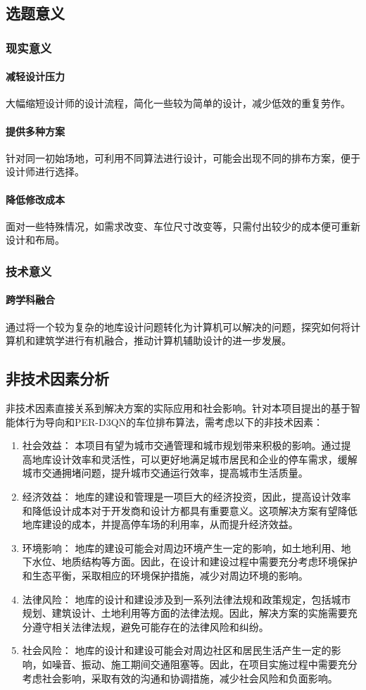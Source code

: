 \subsection{选题意义}
\subsubsection{现实意义}
  \paragraph{减轻设计压力} 大幅缩短设计师的设计流程，简化一些较为简单的设计，减少低效的重复劳作。
  \paragraph{提供多种方案} 针对同一初始场地，可利用不同算法进行设计，可能会出现不同的排布方案，便于设计师进行选择。
  \paragraph{降低修改成本} 面对一些特殊情况，如需求改变、车位尺寸改变等，只需付出较少的成本便可重新设计和布局。
\subsubsection{技术意义}
  \paragraph{跨学科融合} 通过将一个较为复杂的地库设计问题转化为计算机可以解决的问题，探究如何将计算机和建筑学进行有机融合，推动计算机辅助设计的进一步发展。

\subsection{非技术因素分析}
非技术因素直接关系到解决方案的实际应用和社会影响。针对本项目提出的基于智能体行为导向和PER-D3QN的车位排布算法，需考虑以下的非技术因素：
\begin{enumerate}
  \item 社会效益： 本项目有望为城市交通管理和城市规划带来积极的影响。通过提高地库设计效率和灵活性，可以更好地满足城市居民和企业的停车需求，缓解城市交通拥堵问题，提升城市交通运行效率，提高城市生活质量。
  \item 经济效益： 地库的建设和管理是一项巨大的经济投资，因此，提高设计效率和降低设计成本对于开发商和设计方都具有重要意义。这项解决方案有望降低地库建设的成本，并提高停车场的利用率，从而提升经济效益。
   \item 环境影响： 地库的建设可能会对周边环境产生一定的影响，如土地利用、地下水位、地质结构等方面。因此，在设计和建设过程中需要充分考虑环境保护和生态平衡，采取相应的环境保护措施，减少对周边环境的影响。
  \item 法律风险： 地库的设计和建设涉及到一系列法律法规和政策规定，包括城市规划、建筑设计、土地利用等方面的法律法规。因此，解决方案的实施需要充分遵守相关法律法规，避免可能存在的法律风险和纠纷。
  \item 社会风险： 地库的设计和建设可能会对周边社区和居民生活产生一定的影响，如噪音、振动、施工期间交通阻塞等。因此，在项目实施过程中需要充分考虑社会影响，采取有效的沟通和协调措施，减少社会风险和负面影响。
\end{enumerate}
  
